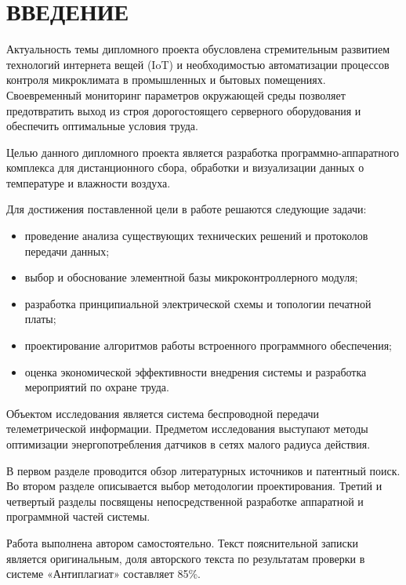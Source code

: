 \chapter*{ВВЕДЕНИЕ}

Актуальность темы дипломного проекта обусловлена стремительным развитием технологий интернета вещей (IoT) и необходимостью автоматизации процессов контроля микроклимата в промышленных и бытовых помещениях. Своевременный мониторинг параметров окружающей среды позволяет предотвратить выход из строя дорогостоящего серверного оборудования и обеспечить оптимальные условия труда.

Целью данного дипломного проекта является разработка программно-аппаратного комплекса для дистанционного сбора, обработки и визуализации данных о температуре и влажности воздуха.

Для достижения поставленной цели в работе решаются следующие задачи:
\begin{itemize}
    \item проведение анализа существующих технических решений и протоколов передачи данных;
    \item выбор и обоснование элементной базы микроконтроллерного модуля;
    \item разработка принципиальной электрической схемы и топологии печатной платы;
    \item проектирование алгоритмов работы встроенного программного обеспечения;
    \item оценка экономической эффективности внедрения системы и разработка мероприятий по охране труда.
\end{itemize}

Объектом исследования является система беспроводной передачи телеметрической информации. Предметом исследования выступают методы оптимизации энергопотребления датчиков в сетях малого радиуса действия.

В первом разделе проводится обзор литературных источников и патентный поиск. Во втором разделе описывается выбор методологии проектирования. Третий и четвертый разделы посвящены непосредственной разработке аппаратной и программной частей системы.

\vspace{0.5cm}

Работа выполнена автором самостоятельно. Текст пояснительной записки является оригинальным, доля авторского текста по результатам проверки в системе «Антиплагиат» составляет 85\%.

\newpage